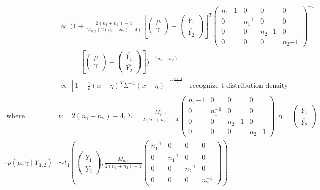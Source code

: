 \documentclass[12pt,letterpaper,twoside]{article}
\begin{document}
\begin{enumerate}[label=(\alph*)]
\begin{align*}
            & \propto \; \biggl(1 + \frac{2(n_1 + n_2) - 4}{M_{\mu, \gamma}(2(n_1 + n_2) - 4)}\left[\left(\begin{matrix}\mu\\ \gamma\end{matrix}\right) - \left(\begin{matrix*}\overline{Y_1}\\ \overline{Y_2}\end{matrix*}\right)\right]^T \left(\begin{matrix*} n_1{-1} & 0 & 0 & 0 \\ 0 & n_1^{-1} & 0 & 0 \\ 0 & 0 & n_2{-1} & 0 \\ 0 & 0 & 0 & n_2{-1} \end{matrix*}\right)^{-1} \\
            & \quad \quad \quad \left[\left(\begin{matrix}\mu\\ \gamma\end{matrix}\right) - \left(\begin{matrix*}\overline{Y_1}\\ \overline{Y_2}\end{matrix*}\right)\right]\biggr)^{-(n_1 + n_2)}\\
            & \propto \; \left[1 + \frac{1}{\nu}(x - \eta)^T\Sigma^{-1}(x - \eta)\right]^{-\frac{\nu + 4}{2}} \quad \text{recognize t-distribution density}\\
        \text{ where }\quad& \nu=2(n_1 + n_2) - 4, \Sigma=\frac{M_{\mu, \gamma}}{2(n_1 + n_2) - 4}\left(\begin{matrix*} n_1{-1} & 0 & 0 & 0 \\ 0 & n_1^{-1} & 0 & 0 \\ 0 & 0 & n_2{-1} & 0 \\ 0 & 0 & 0 & n_2{-1} \end{matrix*}\right), \eta=\left(\begin{matrix*}\overline{Y_1}\\ \overline{Y_2}\end{matrix*}\right)\\
        \therefore p(\mu, \gamma \mid Y_{1,2}) &\sim t_4\left(\left(\begin{matrix*}
            \overline{Y_1}\\ \overline{Y_2} \end{matrix*}\right), \frac{M_{\mu, \gamma}}{2(n_1 + n_2) - 4}\left(\begin{matrix*}
            n_1^{-1} & 0 & 0 & 0 \\ 0 & n_1^{-1} & 0 & 0 \\ 0 & 0 & n_2^{-1} & 0 \\ 0 & 0 & 0 & n_2^{-1}
            \end{matrix*}\right)\right)
    \end{align*}


\end{enumerate}
\end{document}
